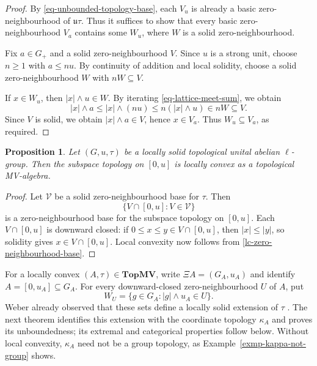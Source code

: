 \documentclass[preprint,3p]{elsarticle}
\theoremstyle{plain}
\newtheorem{prop}[thm]{Proposition}
\theoremstyle{definition}
\newcommand{\TopMV}{\mathbf{TopMV}}
\numberwithin{equation}{section}
\begin{document}
\begin{proof}
By \eqref{eq-unbounded-topology-base}, each $V_u$ is already
a basic zero-neighbourhood of $\mathfrak u\tau$.
Thus it suffices to show that every basic zero-neighbourhood
$V_a$ contains some $W_u$, where $W$ is a solid
zero-neighbourhood.

Fix $a\in G_+$ and a solid zero-neighbourhood $V$.
Since $u$ is a strong unit, choose $n\geq1$ with $a\leq nu$.
By continuity of addition and local solidity, choose a solid
zero-neighbourhood $W$ with $nW\subseteq V$.

If $x\in W_u$, then $|x|\wedge u\in W$.
By iterating \eqref{eq-lattice-meet-sum}, we obtain
\[
 |x|\wedge a
 \leq |x|\wedge(nu)
 \leq n(|x|\wedge u)
 \in nW\subseteq V.
\]
Since $V$ is solid,
we obtain $|x|\wedge a\in V$, hence $x\in V_a$.
Thus $W_u\subseteq V_a$, as required.
\end{proof}

\begin{prop}
\label{prop-interval-locally-convex}
Let $(G,u,\tau)$ be a locally solid topological unital abelian
$\ell$-group.  Then the subspace topology on $[0,u]$ is locally convex as
a topological MV-algebra.
\end{prop}

\begin{proof}
Let $\mathcal V$ be a solid zero-neighbourhood base for $\tau$.
Then
\[
 \{V\cap[0,u]:V\in\mathcal V\}
\]
is a zero-neighbourhood base for the subspace topology on $[0,u]$.
Each $V\cap[0,u]$ is downward closed: if
$0\leq x\leq y\in V\cap[0,u]$, then
$|x|\leq|y|$, so solidity gives $x\in V\cap[0,u]$.
Local convexity now follows from \ref{lc-zero-neighbourhood-base}.
\end{proof}

For a locally convex $(A,\tau)\in\TopMV$, write
$\Xi A=(G_A,u_A)$ and identify $A=[0,u_A]\subseteq G_A$.
For every downward-closed zero-neighbourhood $U$ of $A$, put
\begin{equation}
\label{eq-unbounded-neighbourhood}
 W_U=\{g\in G_A:|g|\wedge u_A\in U\}.
\end{equation}
Weber already observed that these sets define a locally solid
extension of $\tau$ \cite[p.~69]{Weber2023}.
The next theorem identifies this extension with the coordinate
topology $\kappa_A$ and proves its unboundedness; its extremal and
categorical properties follow below.  Without local convexity,
$\kappa_A$ need not be a group topology, as
Example~\ref{exmp-kappa-not-group} shows.
\end{document}
